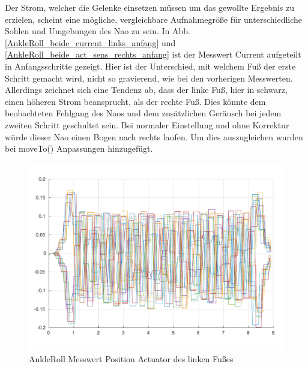 Der Strom, welcher die Gelenke einsetzen müssen um das gewollte Ergebnis zu erzielen, scheint eine mögliche, vergleichbare Aufnahmegröße für unterschiedliche Sohlen und Umgebungen des Nao zu sein. In Abb. \ref{AnkleRoll_beide_current_links_anfang} und \ref{AnkleRoll_beide_act_sens_rechts_anfang} ist der Messwert Current aufgeteilt in Anfangsschritte gezeigt. Hier ist der Unterschied, mit welchem Fuß der erste Schritt gemacht wird, nicht so gravierend, wie bei den vorherigen Messwerten. Allerdings zeichnet sich eine Tendenz ab, dass der linke Fuß, hier in schwarz, einen höheren Strom beansprucht, als der rechte Fuß. Dies könnte dem beobachteten Fehlgang des Naos und dem zusätzlichen Geräusch bei jedem zweiten Schritt geschultet sein. Bei normaler Einstellung und ohne Korrektur würde dieser Nao einen Bogen nach rechts laufen. Um dies auszugleichen wurden bei moveTo() Anpassungen hinzugefügt.   

\begin{figure}[tb]
	\centering
	\includegraphics[width=1\linewidth]{Bilder/AnkleRoll_links_act.pdf}
	\caption{AnkleRoll Messwert Position Actuator des linken Fußes}
	\label{AnkleRoll_links_act}
\end{figure}

